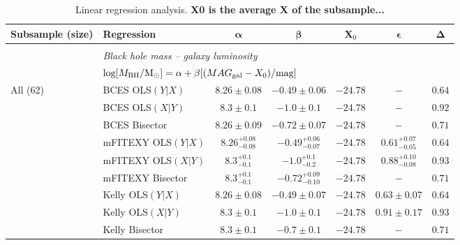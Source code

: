 \documentclass[preprint2]{emulateapj}
\begin{document}
\begin{table}
\centering
\caption{Linear regression analysis. {\bf X0 is the average X of the subsample...}}
\begin{tabular}{llccccc}
\hline
\hline
{\bf Subsample (size)} & {\bf Regression} & $\boldsymbol \alpha$ & $\boldsymbol \beta$ & $\boldsymbol X_0$ & $\boldsymbol \epsilon$ & $\boldsymbol \Delta$ \\ 
\hline 
\\
 & \multicolumn{6}{l}{\emph{Black hole mass -- galaxy luminosity}} \\
  & \multicolumn{6}{l}{$\log[M_{\rm BH}/{\rm M_\odot}] = \alpha + \beta[(MAG_{\rm gal} - X_0)/{\rm mag}]$} \\ [0.5em]
 All (62)		& BCES OLS$(Y|X)$   & $8.26 \pm 0.08$ & $-0.49 \pm 0.06$ & $-24.78$ & $-$ & $0.64$ \\
 			& BCES OLS$(X|Y)$   & $8.3 \pm 0.1$   & $-1.0 \pm 0.1$   & $-24.78$ & $-$ & $0.92$ \\
 			& BCES Bisector     & $8.26 \pm 0.09$ & $-0.72 \pm 0.07$ & $-24.78$ & $-$ & $0.71$ \\
 			& mFITEXY OLS$(Y|X)$ & $8.26^{+0.08}_{-0.08}$ & $-0.49^{+0.06}_{-0.07}$ & $-24.78$ & $0.61^{+0.07}_{-0.05}$ & $0.64$ \\
 			& mFITEXY OLS$(X|Y)$ & $8.3^{+0.1}_{-0.1}$    & $-1.0^{+0.1}_{-0.2}$	& $-24.78$ & $0.88^{+0.10}_{-0.08}$ & $0.93$ \\
 			& mFITEXY Bisector   & $8.3^{+0.1}_{-0.1}$    & $-0.72^{+0.09}_{-0.10}$ & $-24.78$ & $-$    & $0.71$ \\
 			& Kelly OLS$(Y|X)$  & $8.26 \pm 0.08$ & $-0.49 \pm 0.07$ & $-24.78$ & $0.63 \pm 0.07$ & $0.64$ \\
 			& Kelly OLS$(X|Y)$  & $8.3 \pm 0.1$ & $-1.0 \pm 0.1$ & $-24.78$ & $0.91 \pm 0.17$ & $0.93$ \\
 			& Kelly Bisector    & $8.3 \pm 0.1$ & $-0.7 \pm 0.1$ & $-24.78$ & $-$    & $0.71$ \\ [0.5em]


\end{tabular}
\end{table}
\end{document}

